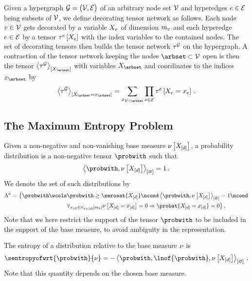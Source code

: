 Given a hypergraph $\mathcal{G}=\big(\mathcal{V},\mathcal{E}\big)$ of an arbitrary node set $\mathcal{V}$ and hyperedges $e\in\mathcal{E}$ being subsets of $\mathcal{V}$, we define decorating tensor network as follows.
Each node $v\in\mathcal{V}$ gets decorated by a variable $X_{v}$ of dimension $m_{v}$ and each hyperedge $e\in\mathcal{E}$ by a tensor $\tau^{e}\left[X_{e}\right]$ with the index variables to the contained nodes.
The set of decorating tensors then builds the tensor network $\tau^{\mathcal{G}}$ on the hypergraph.
A contraction of the tensor network keeping the nodes $\arbset\subset\nodes$ open is then the tensor $\contractionof{\extnet}{\catvariableof{\arbset}}$ with variables $\catvariableof{\arbset}$ and coordinates to the indices $\catindexof{\arbset}$ by
\begin{align*}
    \contractionof{\extnet}{\indexedcatvariableof{\arbset}}
    = \sum_{\catindexof{\nodes\backslash\arbset}} \prod_{\edgein} \hypercoreofat{\edge}{\indexedcatvariableof{\edge}} \, .
\end{align*}

\subsection{The Maximum Entropy Problem}

Given a non-negative and non-vanishing base measure $\nu\left[X_{[d]}\right]$, a probability distribution is a non-negative tensor $\probwith$ such that
\begin{align*}
    \contraction{\probwith,\basemeasurewith} = 1 \, .
\end{align*}
We denote the set of such distributions by
\begin{align*}
    \distmeasuredby{\basemeasure}
    = \big\{ \probwith \wcols &\probwith \geq \zerosat{\shortcatvariables} \ncond \contraction{\probwith,\basemeasurewith} = 1 \ncond \\
    &\forall_{\shortcatindicesin} \basemeasureat{\indexedshortcatvariables}=0 \Rightarrow \probat{\indexedshortcatvariables}=0  \big\} \, .
\end{align*}
Note that we here restrict the support of the tensor $\probwith$ to be included in the support of the base measure, to avoid ambiguity in the representation.

The entropy of a distribution relative to the base measure $\nu$ is
\begin{align*}
    \sentropyofwrt{\probwith}{\basemeasure}
    = -\contraction{\probwith,\lnof{\probwith},\basemeasurewith} \, .
\end{align*}
Note that this quantity depends on the chosen base measure.

